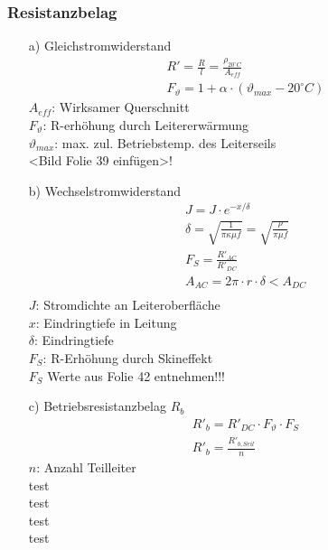 \subsubsection{Resistanzbelag}
\begin{enumerate}
    \item[a)]{Gleichstromwiderstand} 
    \begin{gather*}
        R' = \frac{R}{l} = \frac{\rho_{20^\circ C}}{A_{eff}}\\
        F_\vartheta = 1+\alpha \cdot (\vartheta_{max} - 20^\circ C)
    \end{gather*}
    $A_{eff}$: Wirksamer Querschnitt\\
    $F_{\vartheta}$: R-erhöhung durch Leitererwärmung\\
    $\vartheta_{max}$: max. zul. Betriebstemp. des Leiterseils\\

    <Bild Folie 39 einfügen>!
    

    \item[b)]{Wechselstromwiderstand}
    \begin{gather*}
    J=J\cdot e^{-x/\delta}\\
    \delta = \sqrt{\frac{1}{\pi\kappa\mu f}} = \sqrt{\frac{\rho}{\pi\mu f}}\\
    F_S = \frac{R'_{AC}}{R'_{DC}}\\
    A_{AC} = 2\pi\cdot r \cdot \delta < A_{DC}\\
    \end{gather*} 
    $J$: Stromdichte an Leiteroberfläche\\
    $x$: Eindringtiefe in Leitung\\
    $\delta$: Eindringtiefe\\
    $F_S$: R-Erhöhung durch Skineffekt\\

    $F_S$ Werte aus Folie 42 entnehmen!!!

    \item[c)]{Betriebsresistanzbelag $R_b$}
    \begin{gather*}
        R'_b = R'_{DC} \cdot F_\vartheta \cdot F_S\\
        R'_b = \frac{R'_{b, Seil}}{n}
    \end{gather*}
    $n$: Anzahl Teilleiter\\
    test\\test\\test\\test\\
\end{enumerate}

